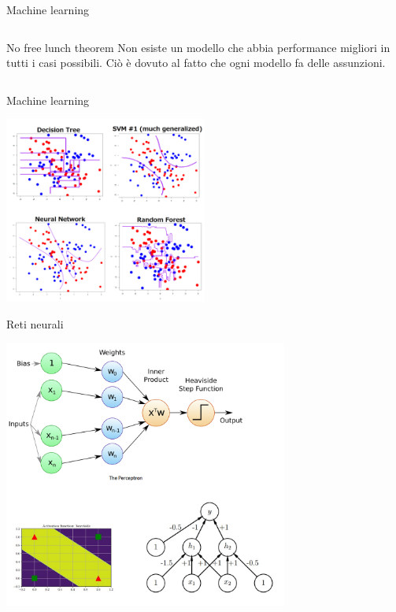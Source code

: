 \documentclass[11pt]{beamer}
\begin{document}
\begin{frame}{Machine learning \cite{pml1Book,pml2Book,classification,regression}}
\begin{columns}
\begin{column}{0.4\textwidth}
\begin{center}
\end{center}
\begin{alertblock}{No free lunch theorem}
Non esiste un modello che abbia performance migliori in tutti i casi possibili. Ciò è dovuto al fatto che ogni modello fa delle assunzioni.
\end{alertblock}
\end{column}
\end{columns}
\end{frame}


\begin{frame}{Machine learning \cite{pml1Book,pml2Book,classification,regression,KirkDBorne}}

\begin{center}
\includegraphics[width=0.5\textwidth]{Pic/ML_dec_boundary.png}
\end{center}


\end{frame}




\begin{frame}{Reti neurali \cite{pml1Book,pml2Book}}
\begin{center}
\includegraphics[width=0.7\textwidth]{Pic/perceptron.png}
\end{center}
\end{frame}
\end{document}
